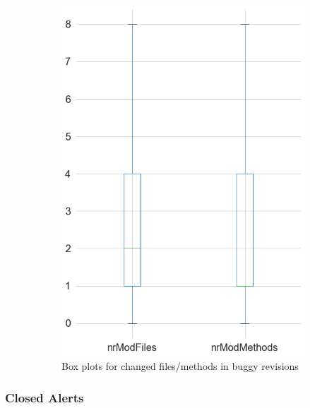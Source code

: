 \begin{figure}[H]
\begin{subfigure}{0.5\textwidth}
		\includegraphics[scale=0.3]{./src/data_analysis/buggy_box_files.png}
		\caption{Box plots for changed files/methods in buggy revisions}
	\end{subfigure}
	\caption{}
\end{figure}

\newpage
\subsubsection{Closed Alerts}

